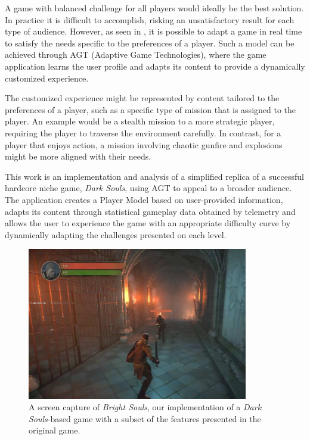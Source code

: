 A game with balanced challenge for all players would ideally be the best solution. In practice it is difficult to accomplish, risking an unsatisfactory result for each type of audience. However, as seen in \cite{ARTICLE_PlayerCentredGameDesign}, it is possible to adapt a game in real time to satisfy the needs specific to the preferences of a player. Such a model can be achieved through AGT (Adaptive Game Technologies), where the game application learns the user profile and adapts its content to provide a dynamically customized experience.

The customized experience might be represented by content tailored to the preferences of a player, such as a specific type of mission that is assigned to the player. An example would be a stealth mission to a more strategic player, requiring the player to traverse the environment carefully. In contrast, for a player that enjoys action, a mission involving chaotic gunfire and explosions might be more aligned with their needs.

This work is an implementation and analysis of a simplified replica of a successful hardcore niche game, \emph{Dark Souls}, using AGT to appeal to a broader audience. The application creates a Player Model based on user-provided information, adapts its content through statistical gameplay data obtained by telemetry and allows the user to experience the game with an appropriate difficulty curve by dynamically adapting the challenges presented on each level.

\begin{figure}[!ht]
    \caption{A screen capture of \emph{Bright Souls}, our implementation of a \emph{Dark Souls}-based game with a subset of the features presented in the original game.}
    \begin{center}
        \includegraphics[width=26em]{figures/fig-bright-souls.jpg}
    \end{center}
    \label{fig:ex1}
\end{figure}


